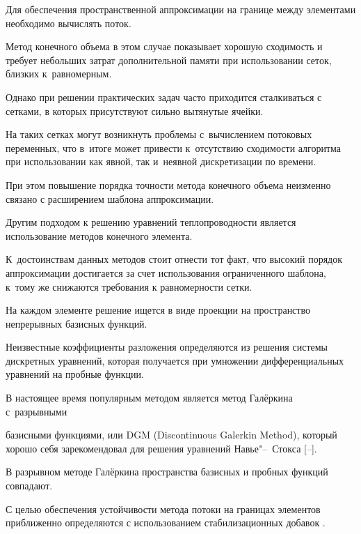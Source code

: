 Для обеспечения пространственной аппроксимации на границе между элементами необходимо вычислять поток. 

Метод конечного объема в этом случае показывает хорошую сходимость и требует небольших затрат дополнительной памяти при использовании сеток, близких к~равномерным. 

Однако при решении практических задач часто приходится сталкиваться с сетками, в которых присутствуют сильно вытянутые ячейки. 

На таких сетках могут возникнуть проблемы с~вычислением потоковых переменных, что в~итоге может привести к~отсутствию сходимости алгоритма при использовании как  явной, так и~неявной дискретизации по времени. 

При этом  повышение порядка точности метода конечного объема неизменно связано с расширением шаблона аппроксимации.   



Другим подходом к решению уравнений теплопроводности является использование методов конечного элемента. 

К~достоинствам данных методов стоит отнести тот факт, что высокий порядок аппроксимации достигается за счет использования ограниченного шаблона, к~тому же снижаются требования к равномерности сетки.

На каждом элементе решение ищется в виде проекции на пространство непрерывных базисных функций. 

Неизвестные коэффициенты разложения определяются из решения системы дискретных уравнений, которая получается при умножении дифференциальных уравнений на пробные функции. 



В настоящее время популярным методом является метод Галёркина с~разрывными


базисными функциями, или DGM (Discontinuous Galerkin Method), который хорошо себя зарекомендовал для решения уравнений Навье"--~Стокса [--]. 

В разрывном методе Галёркина пространства базисных и пробных функций совпадают. 

С целью обеспечения устойчивости метода потоки на границах элементов приближенно определяются с использованием стабилизационных добавок \cite{Masyagin:bib:PanyYadav}.



